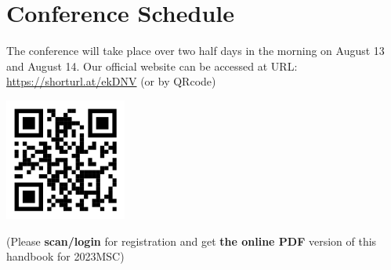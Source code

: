 \documentclass{article}
\begin{document}
\section*{Conference Schedule}
The conference will take place over two half days in the morning on August 13 and August 14.
Our official website can be accessed at URL:  \url{https://shorturl.at/ekDNV} (or by QRcode)

\begin{center}
    \includegraphics[width=0.3\textwidth]{QRcode_2023MSC.png}
\end{center}
(Please \textbf{scan/login} for registration and get \textbf{the online PDF} version of this handbook for 2023MSC)



%


\end{document}
